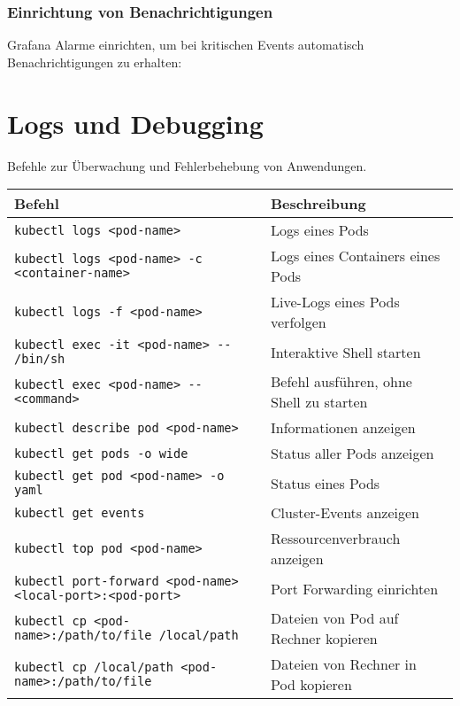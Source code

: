 \subsubsection{Einrichtung von Benachrichtigungen}
Grafana Alarme einrichten, um bei kritischen Events automatisch Benachrichtigungen zu erhalten:


\newpage

\section{Logs und Debugging}
Befehle zur Überwachung und Fehlerbehebung von Anwendungen.\\

\noindent
\begin{tabular}{|p{}|p{}|}
\hline
\textbf{Befehl} & \textbf{Beschreibung} \\
\hline
\texttt{kubectl logs <pod-name>} & Logs eines Pods \\
\texttt{kubectl logs <pod-name> -c <container-name>} & Logs eines Containers eines Pods \\
\texttt{kubectl logs -f <pod-name>} & Live-Logs eines Pods verfolgen \\
\texttt{kubectl exec -it <pod-name> {-}{-} /bin/sh} & Interaktive Shell starten \\
\texttt{kubectl exec <pod-name> {-}{-} <command>} & Befehl ausführen, ohne Shell zu starten \\
\texttt{kubectl describe pod <pod-name>} & Informationen anzeigen \\
\texttt{kubectl get pods -o wide} & Status aller Pods anzeigen\\
\texttt{kubectl get pod <pod-name> -o yaml} & Status eines Pods\\
\texttt{kubectl get events} & Cluster-Events anzeigen \\
\texttt{kubectl top pod <pod-name>} & Ressourcenverbrauch anzeigen \\
\texttt{kubectl port-forward <pod-name> <local-port>:<pod-port>} & Port Forwarding einrichten\\
\texttt{kubectl cp <pod-name>:/path/to/file /local/path} & Dateien von Pod auf Rechner kopieren\\
\texttt{kubectl cp /local/path <pod-name>:/path/to/file} & Dateien von Rechner in Pod kopieren\\
\hline
\end{tabular}
\\


